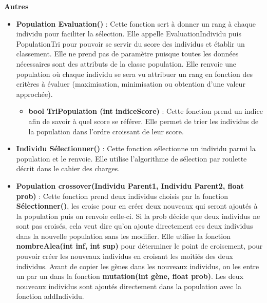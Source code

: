 \documentclass[a4paper,11pt]{article}
\begin{document}
			\textbf{Autres}
				\begin{itemize}
							\item \textbf{Population Evaluation()} : Cette fonction sert à donner un rang à chaque individu pour faciliter la sélection. 
								Elle appelle EvaluationIndividu puis PopulationTri pour pouvoir se servir du score des individus et établir un classement. 
								Elle ne prend pas de paramètre puisque toutes les données nécessaires sont des attributs de la classe population. 
								Elle renvoie une population où chaque individu se sera vu attribuer un rang en fonction des critères à évaluer (maximisation, minimisation ou obtention d’une valeur approchée).\vspace{0.2cm}
								\begin{itemize}
								\item \textbf{bool TriPopulation (int indiceScore)} : Cette fonction prend un indice afin de savoir à quel score se référer. 
									Elle permet de trier les individus de la population dans l’ordre croissant de leur score.\vspace{0.2cm}
								\end{itemize}
							
							\item \textbf{Individu Sélectionner()} : Cette fonction sélectionne un individu parmi la population et le renvoie. 
								Elle utilise l’algorithme de sélection par roulette décrit dans le cahier des charges.\vspace{0.2cm}
								
							\item \textbf{Population crossover(Individu Parent1, Individu Parent2, float prob)} : Cette fonction prend deux individus choisis par la fonction \textbf{Sélectionner()}, les croise pour en créer deux nouveaux qui seront ajoutés à la population puis on renvoie celle-ci. 
							Si la prob décide que deux individus ne sont pas croisés, cela veut dire qu’on ajoute directement ces deux individus dans la nouvelle population sans les modifier. 
								Elle utilise la fonction \textbf{nombreAlea(int inf, int sup)} pour déterminer le point de croisement, pour pouvoir créer les nouveaux individus en croisant les moitiés des deux individus.
								Avant de copier les gènes dans les nouveaux individus, on les entre un par un dans la fonction \textbf{mutation(int gène, float prob)}. 
								Les deux nouveaux individus sont ajoutés directement dans la population  avec la fonction addIndividu.\vspace{0.2cm}
							

\end{itemize}
\end{document}
